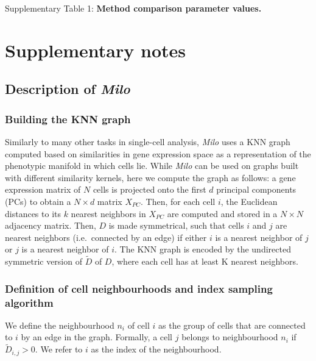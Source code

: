\documentclass[
]{article}
\begin{document}
Supplementary Table 1: \textbf{Method comparison parameter values.}

\newpage

\hypertarget{supplementary-notes}{%
\section{Supplementary notes}\label{supplementary-notes}}

\hypertarget{description-of-milo}{%
\subsection{\texorpdfstring{Description of \emph{Milo}}{Description of Milo}}\label{description-of-milo}}

\hypertarget{building-the-knn-graph}{%
\subsubsection{Building the KNN graph}\label{building-the-knn-graph}}

Similarly to many other tasks in single-cell analysis, \emph{Milo} uses a KNN graph computed based on similarities in gene expression space as a representation of the phenotypic manifold in which cells lie. While \emph{Milo} can be used on graphs built with different similarity kernels, here we compute the graph as follows: a gene expression matrix of \(N\) cells is projected onto the first \(d\) principal components (PCs) to obtain a \(N \times d\) matrix \(X_{PC}\). Then, for each cell \(i\), the Euclidean distances to its \(k\) nearest neighbors in \(X_{PC}\) are computed and stored in a \(N \times N\) adjacency matrix. Then, \(D\) is made symmetrical, such that cells \(i\) and \(j\) are nearest neighbors (i.e.~connected by an edge) if either \(i\) is a nearest neighbor of \(j\) or \(j\) is a nearest neighbor of \(i\). The KNN graph is encoded by the undirected symmetric version of \(\tilde{D}\) of \(D\), where each cell has at least K nearest neighbors.

\hypertarget{definition-of-cell-neighbourhoods-and-index-sampling-algorithm}{%
\subsubsection{Definition of cell neighbourhoods and index sampling algorithm}\label{definition-of-cell-neighbourhoods-and-index-sampling-algorithm}}

We define the neighbourhood \(n_i\) of cell \(i\) as the group of cells that are connected to \(i\) by an edge in the graph.
Formally, a cell \(j\) belongs to neighbourhood \(n_i\) if \(\tilde{D}_{i,j} > 0\). We refer to \(i\) as the index of the neighbourhood.
\end{document}
